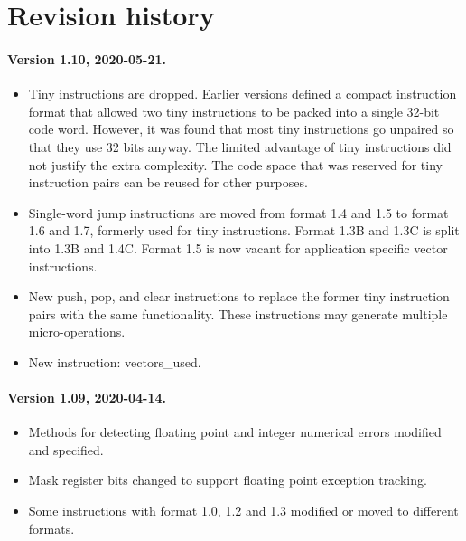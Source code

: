 \documentclass[forwardcom.tex]{subfiles}
\begin{document}
\RaggedRight

\chapter{Revision history}

\subsubsection{Version 1.10, 2020-05-21.}

\begin{itemize}
\item Tiny instructions are dropped. Earlier versions defined a compact instruction format that allowed two tiny instructions to be packed into a single 32-bit code word. However, it was found that most tiny instructions go unpaired so that they use 32 bits anyway. The limited advantage of tiny instructions did not justify the extra complexity. The code space that was reserved for tiny instruction pairs can be reused for other purposes.

\item Single-word jump instructions are moved from format 1.4 and 1.5 to format 1.6 and 1.7, formerly used for tiny instructions. Format 1.3B and 1.3C is split into 1.3B and 1.4C. Format 1.5 is now vacant for application specific vector instructions.

\item New push, pop, and clear instructions to replace the former tiny instruction pairs with the same functionality. These instructions may generate multiple micro-operations.

\item New instruction: vectors\_used.

\end{itemize}


\subsubsection{Version 1.09, 2020-04-14.}

\begin{itemize}
\item Methods for detecting floating point and integer numerical errors modified and specified.
\item Mask register bits changed to support floating point exception tracking.
\item Some instructions with format 1.0, 1.2 and 1.3 modified or moved to different formats.
\end{itemize}
\end{document}
